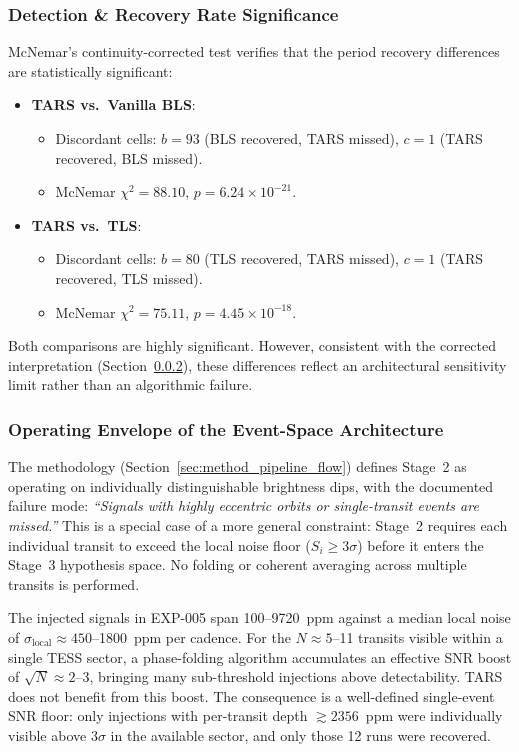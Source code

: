 \subsubsection{Detection \& Recovery Rate Significance}
McNemar's continuity-corrected test verifies that the period recovery differences are statistically significant:
\begin{itemize}
    \item \textbf{TARS vs.\ Vanilla BLS}:
        \begin{itemize}
            \item Discordant cells: $b = 93$ (BLS recovered, TARS missed), $c = 1$ (TARS recovered, BLS missed).
            \item McNemar $\chi^2 = 88.10$, $p = 6.24 \times 10^{-21}$.
        \end{itemize}
    \item \textbf{TARS vs.\ TLS}:
        \begin{itemize}
            \item Discordant cells: $b = 80$ (TLS recovered, TARS missed), $c = 1$ (TARS recovered, TLS missed).
            \item McNemar $\chi^2 = 75.11$, $p = 4.45 \times 10^{-18}$.
        \end{itemize}
\end{itemize}
Both comparisons are highly significant. However, consistent with the corrected interpretation (Section~\ref{sec:exp5_physical_explanation}), these differences reflect an architectural sensitivity limit rather than an algorithmic failure.

\subsubsection{Operating Envelope of the Event-Space Architecture} \label{sec:exp5_physical_explanation}

The methodology (Section~\ref{sec:method_pipeline_flow}) defines Stage~2 as operating on individually distinguishable brightness dips, with the documented failure mode: \textit{``Signals with highly eccentric orbits or single-transit events are missed.''}  This is a special case of a more general constraint: Stage~2 requires each individual transit to exceed the local noise floor ($S_i \ge 3\sigma$) before it enters the Stage~3 hypothesis space. No folding or coherent averaging across multiple transits is performed.

The injected signals in EXP-005 span 100--9720~ppm against a median local noise of $\sigma_\text{local} \approx 450$--1800~ppm per cadence. For the $N \approx 5$--11 transits visible within a single TESS sector, a phase-folding algorithm accumulates an effective SNR boost of $\sqrt{N} \approx 2$--3, bringing many sub-threshold injections above detectability. TARS does not benefit from this boost. The consequence is a well-defined single-event SNR floor: only injections with per-transit depth $\gtrsim 2356$~ppm were individually visible above $3\sigma$ in the available sector, and only those 12 runs were recovered.

